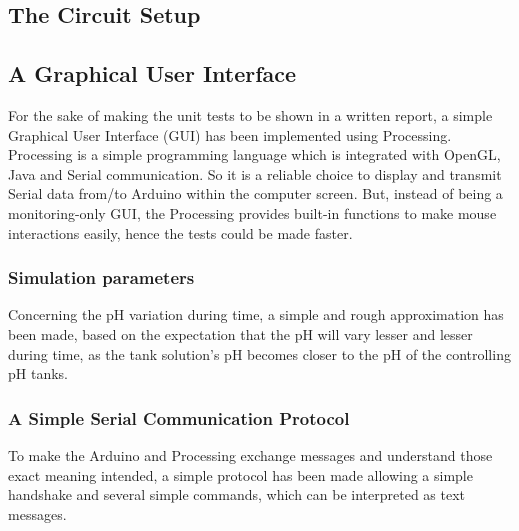 
\subsection{The Circuit Setup}


\subsection{A Graphical User Interface}

For the sake of making the unit tests to be shown in a written report,
a simple Graphical User Interface (GUI) has been implemented using Processing.
Processing is a simple programming language which is integrated with OpenGL,
Java and Serial communication.
So it is a reliable choice to display and transmit Serial data from/to Arduino within the computer screen.
But,
instead of being a monitoring-only GUI,
the Processing provides built-in functions to make mouse interactions easily,
hence the tests could be made faster.

\subsubsection{Simulation parameters}
\label{sec:simPar}

Concerning the pH variation during time,
a simple and rough approximation has been made, 
based on the expectation that the pH will vary lesser and lesser during time,
as the tank solution's pH becomes closer to the pH of the controlling pH tanks.

\subsubsection{A Simple Serial Communication Protocol}

To make the Arduino and Processing exchange messages and understand those exact meaning intended,
a simple protocol has been made allowing a simple handshake and several simple commands,
which can be interpreted as text messages.

